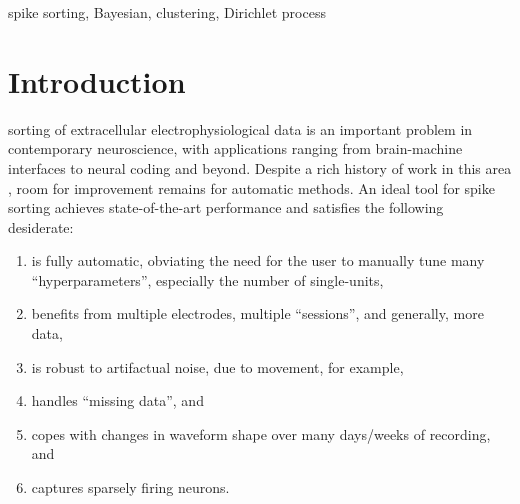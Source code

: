 \documentclass[journal]{IEEEtran}
\begin{document}
\begin{IEEEkeywords}
spike sorting, Bayesian, clustering, Dirichlet process
\end{IEEEkeywords}






%
\IEEEpeerreviewmaketitle



\section{Introduction\label{sec:intro}}
%
%
%
%

 sorting of extracellular electrophysiological data is an important problem in contemporary neuroscience, with applications ranging from brain-machine interfaces \cite{Nicolelis2009} to neural coding \cite{Rieke1997} and beyond.  Despite a rich history of work in this area \cite{Wheeler1991, Einevoll2012}, room for improvement remains for automatic methods.  An ideal tool for spike sorting achieves state-of-the-art performance and satisfies the following desiderate:
\begin{enumerate}
	\item is fully automatic, obviating the need for the user to manually tune many ``hyperparameters'', especially the number of single-units,
	\item benefits from multiple electrodes, multiple ``sessions'', and generally, more data, 
	\item is robust to artifactual noise, due to movement, for example,
	\item handles ``missing data'', and
	\item copes with changes in waveform shape over many days/weeks of recording, and
	\item captures sparsely firing neurons.
\end{enumerate}
\end{document}
